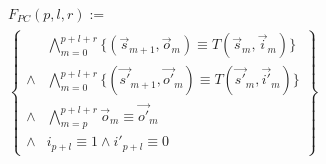 \documentclass[conference]{IEEEtran}
\begin{document}
\begin{multline}\label{uniqt1}
F_{PC}(p,l,r):= \\
\left\{
\begin{array}{cc}
&\bigwedge_{m=0}^{p+l+r}
\{
(\vec{s}_{m+1},\vec{o}_m)\equiv T(\vec{s}_m,\vec{i}_m)
\}
\\
\wedge&\bigwedge_{m=0}^{p+l+r}
\{
(\vec{s'}_{m+1},\vec{o'}_m)\equiv T(\vec{s'}_m,\vec{i'}_m)
\}
\\
\wedge&\bigwedge_{m=p}^{p+l+r}\vec{o}_m\equiv \vec{o'}_m \\
\wedge& i_{p+l}\equiv 1 \wedge  i'_{p+l}\equiv 0 
\end{array}
\right\}
\end{multline}







% 
% 
% 
\end{document}
